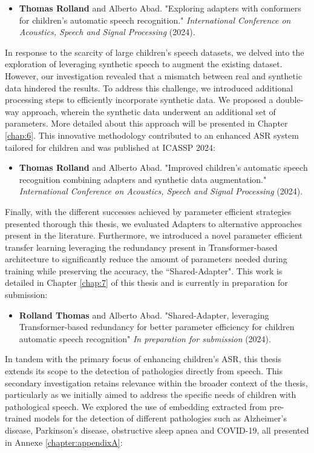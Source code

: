 \begin{itemize}
    \item \textbf{Thomas Rolland} and Alberto Abad. "Exploring adapters with conformers for children’s automatic speech recognition." \textit{ International Conference on Acoustics, Speech and Signal Processing} (2024).
\end{itemize}

In response to the scarcity of large children's speech datasets, we delved into the exploration of leveraging synthetic speech to augment the existing dataset. However, our investigation revealed that a mismatch between real and synthetic data hindered the results. To address this challenge, we introduced additional processing steps to efficiently incorporate synthetic data. We proposed a double-way approach, wherein the synthetic data underwent an additional set of parameters. More detailed about this approach will be presented in Chapter \ref{chap:6}. This innovative methodology contributed to an enhanced \ac{ASR} system tailored for children and was published at ICASSP 2024:

\begin{itemize}
    \item \textbf{Thomas Rolland} and Alberto Abad. "Improved children’s automatic speech recognition combining adapters and synthetic data augmentation." \textit{International Conference on Acoustics, Speech and Signal Processing} (2024).
\end{itemize}

Finally, with the different successes achieved by parameter efficient strategies presented thorough this thesis, we evaluated Adapters to alternative approaches present in the literature. Furthermore, we introduced a novel parameter efficient transfer learning leveraging the redundancy present in Transformer-based architecture to significantly reduce the amount of parameters needed during training while preserving the accuracy, the ``Shared-Adapter". This work is detailed in Chapter \ref{chap:7} of this thesis and is currently in preparation for submission:
\begin{itemize}
    \item \textbf{Rolland Thomas} and Alberto Abad. "Shared-Adapter, leveraging Transformer-based redundancy for better parameter efficiency for children automatic speech recognition" \textit{In preparation for submission} (2024).
\end{itemize}

In tandem with the primary focus of enhancing children's \ac{ASR}, this thesis extends its scope to the detection of pathologies directly from speech. This secondary investigation retains relevance within the broader context of the thesis, particularly as we initially aimed to address the specific needs of children with pathological speech. We explored the use of embedding extracted from pre-trained models for the detection of different pathologies such as Alzheimer's disease, Parkinson's disease, obstructive sleep apnea and COVID-19, all presented in Annexe \ref{chapter:appendixA}:


